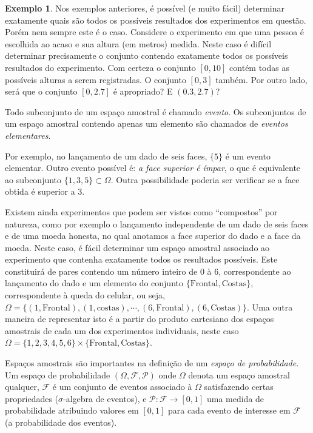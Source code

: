 \documentclass[
]{book}
\theoremstyle{definition}
\theoremstyle{definition}
\newtheorem{example}{Exemplo}[chapter]
\theoremstyle{definition}
\theoremstyle{remark}
\begin{document}
\begin{example}
\protect\hypertarget{exm:examexp}{}{\label{exm:examexp} }Nos exemplos anteriores, é possível (e muito fácil) determinar exatamente quais são todos os possíveis resultados dos experimentos em questão. Porém nem sempre este é o caso. Considere o experimento em que uma pessoa é escolhida ao acaso e sua altura (em metros) medida. Neste caso é difícil determinar precisamente o conjunto contendo exatamente todos os possíveis resultados do experimento. Com certeza o conjunto \([0,10]\) contém todas as possíveis alturas a serem registradas. O conjunto \([0,3]\) também. Por outro lado, será que o conjunto \([0,2.7]\) é apropriado? E \((0.3,2.7)\)?
\end{example}

Todo subconjunto de um espaço amostral é chamado \emph{evento}. Os
subconjuntos de um espaço amostral contendo apenas um elemento são
chamados de \emph{eventos elementares}.

Por exemplo, no lançamento de um dado de seis faces, \(\{5\}\) é um evento elementar. Outro evento possível é: \emph{a face superior é ímpar}, o que é equivalente ao subconjunto \(\{1,3,5\}\subset\Omega\). Outra possibilidade poderia ser verificar se a face obtida é superior a 3.

Existem ainda experimentos que podem ser vistos como ``compostos'' por natureza, como por exemplo o lançamento independente de um dado de seis faces e de uma moeda honesta, no qual anotamos a face superior do dado e a face da moeda. Neste caso, é fácil determinar um espaço amostral associado ao experimento que contenha exatamente todos os resultados possíveis. Este constituirá de pares contendo um número inteiro de 0 à 6, correspondente ao lançamento do dado e um elemento do conjunto \(\{\mathrm{Frontal},\mathrm{Costas}\}\), correspondente à queda do celular, ou seja, \(\Omega=\{(1, \mathrm{Frontal}), (1,\mathrm{costas}), \cdots, (6, \mathrm{Frontal}), (6,\mathrm{Costas})\}\). Uma outra maneira de representar isto é a partir do produto cartesiano dos espaços amostrais de cada um dos experimentos individuais, neste caso \(\Omega=\{1,2,3,4,5,6\}\times\{\mathrm{Frontal},\mathrm{Costas}\}\).

Espaços amostrais são importantes na definição de um \emph{espaço de probabilidade}. Um espaço de probabilidade \((\Omega, \mathcal{F},\mathcal{P})\) onde \(\Omega\) denota um espaço amostral qualquer, \(\mathcal{F}\) é um conjunto de eventos associado à \(\Omega\) satisfazendo certas propriedades (\(\sigma\)-algebra de eventos), e \(\mathcal{P}:\mathcal{F}\rightarrow[0,1]\) uma medida de probabilidade atribuindo valores em \([0,1]\) para cada evento de interesse em \(\mathcal{F}\) (a probabilidade dos eventos).
\end{document}
